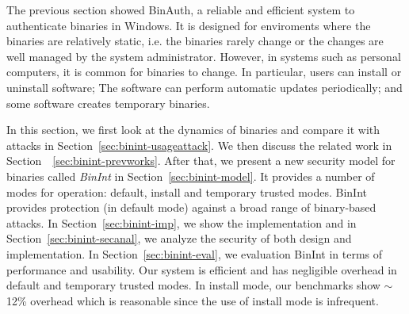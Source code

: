
The previous section showed BinAuth, a reliable and efficient system
to authenticate binaries in Windows.
It is designed for enviroments where the binaries are relatively static,
i.e. the binaries rarely change or the changes are well managed by
the system administrator.
However, in systems such as personal computers, it is common for binaries
to change.
In particular, users can install or uninstall software;
The software can perform automatic updates periodically;
and some software creates temporary binaries.

In this section, we first look at the dynamics of binaries and compare
it with attacks in Section~\ref{sec:binint-usageattack}.
We then discuss the related work in Section~~\ref{sec:binint-prevworks}.
After that, we present a new security model for binaries called
{\em BinInt} in Section~\ref{sec:binint-model}.
It provides a number of modes for operation: default, install
and temporary trusted modes.
BinInt provides protection (in default mode) against a broad range of
binary-based attacks.
In Section~\ref{sec:binint-imp}, we show the implementation and
in Section~\ref{sec:binint-secanal}, we analyze the security of
both design and implementation.
In Section~\ref{sec:binint-eval}, we evaluation BinInt in terms of
performance and usability.
Our system is efficient and has negligible overhead in default and temporary
trusted modes. 
In install mode, our benchmarks
show $\sim$12\% overhead which is reasonable since
the use of install mode is infrequent.
